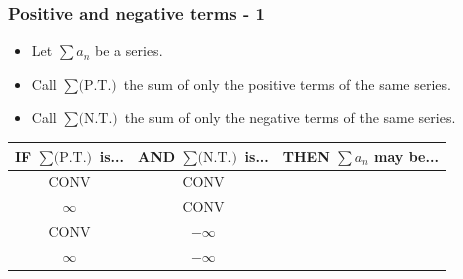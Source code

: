 \documentclass[14pt]{beamer}
\begin{document}
\begin{frame}[t]
	\fontsize{13}{13}\selectfont
	\frametitle{Positive and negative terms - 1}

	\begin{itemize}
		\item Let $\displaystyle \sum a_{n}$ be a series.

		\item Call $\displaystyle \sum \text{(P.T.)}$ the sum of only the positive terms
			of the same series.

		\item Call $\displaystyle \sum \text{(N.T.)}$ the sum of only the negative terms
			of the same series.
	\end{itemize}


	\begin{center}
		\begin{tabular}{c|c|c}
			{\color{blue} IF $\displaystyle \sum \text{(P.T.)}$ is...} & {\color{blue} AND $\displaystyle \sum \text{(N.T.)}$ is...} & {\color{blue} THEN $\displaystyle \sum a_{n}$ may be...} \\
			\hline
			CONV                                                       & CONV                                                        & \phantom{$\displaystyle \frac{1}{1}$}                    \\
			\hline
			$\infty$                                                   & CONV                                                        & \phantom{$\displaystyle \frac{1}{1}$}                    \\
			\hline
			CONV                                                       & $-\infty$                                                   & \phantom{$\displaystyle \frac{1}{1}$}                    \\
			\hline
			$\infty$                                                   & $-\infty$                                                   & \phantom{$\displaystyle \frac{1}{1}$}                    \\
			\hline
		\end{tabular}
	\end{center}
\end{frame}
\end{document}
